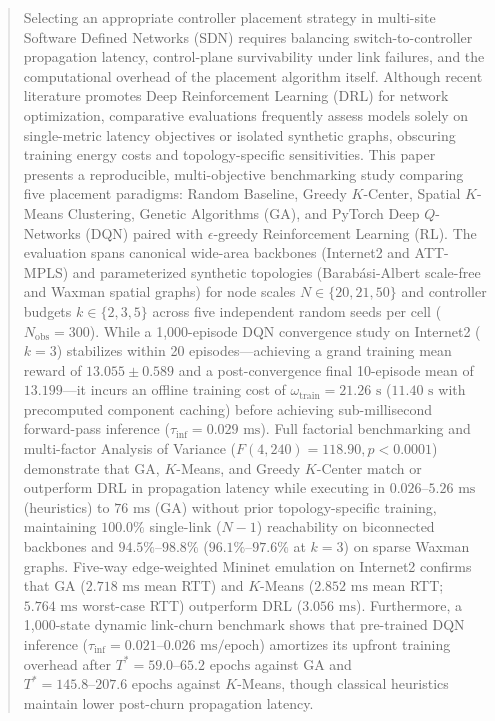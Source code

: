 \documentclass[conference]{IEEEtran}
\begin{document}
\begin{abstract}
Selecting an appropriate controller placement strategy in multi-site Software Defined Networks (SDN) requires balancing switch-to-controller propagation latency, control-plane survivability under link failures, and the computational overhead of the placement algorithm itself. Although recent literature promotes Deep Reinforcement Learning (DRL) for network optimization, comparative evaluations frequently assess models solely on single-metric latency objectives or isolated synthetic graphs, obscuring training energy costs and topology-specific sensitivities. This paper presents a reproducible, multi-objective benchmarking study comparing five placement paradigms: Random Baseline, Greedy $K$-Center, Spatial $K$-Means Clustering, Genetic Algorithms (GA), and PyTorch Deep $Q$-Networks (DQN) paired with $\epsilon$-greedy Reinforcement Learning (RL). The evaluation spans canonical wide-area backbones (Internet2 and ATT-MPLS) and parameterized synthetic topologies (Barab\'{a}si-Albert scale-free and Waxman spatial graphs) for node scales $N \in \{20, 21, 50\}$ and controller budgets $k \in \{2, 3, 5\}$ across five independent random seeds per cell ($N_{\text{obs}} = 300$). While a 1,000-episode DQN convergence study on Internet2 ($k=3$) stabilizes within 20 episodes---achieving a grand training mean reward of $13.055 \pm 0.589$ and a post-convergence final 10-episode mean of $13.199$---it incurs an offline training cost of $\omega_{\text{train}} = 21.26\text{ s}$ ($11.40\text{ s}$ with precomputed component caching) before achieving sub-millisecond forward-pass inference ($\tau_{\text{inf}} = 0.029\text{ ms}$). Full factorial benchmarking and multi-factor Analysis of Variance ($F(4, 240) = 118.90, p < 0.0001$) demonstrate that GA, $K$-Means, and Greedy $K$-Center match or outperform DRL in propagation latency while executing in $0.026\text{--}5.26\text{ ms}$ (heuristics) to $76\text{ ms}$ (GA) without prior topology-specific training, maintaining $100.0\%$ single-link ($N-1$) reachability on biconnected backbones and $94.5\%\text{--}98.8\%$ ($96.1\%\text{--}97.6\%$ at $k=3$) on sparse Waxman graphs. Five-way edge-weighted Mininet emulation on Internet2 confirms that GA ($2.718\text{ ms}$ mean RTT) and $K$-Means ($2.852\text{ ms}$ mean RTT; $5.764\text{ ms}$ worst-case RTT) outperform DRL ($3.056\text{ ms}$). Furthermore, a 1,000-state dynamic link-churn benchmark shows that pre-trained DQN inference ($\tau_{\text{inf}} = 0.021\text{--}0.026\text{ ms/epoch}$) amortizes its upfront training overhead after $T^* = 59.0\text{--}65.2\text{ epochs}$ against GA and $T^* = 145.8\text{--}207.6\text{ epochs}$ against $K$-Means, though classical heuristics maintain lower post-churn propagation latency.
\end{abstract}
\end{document}
